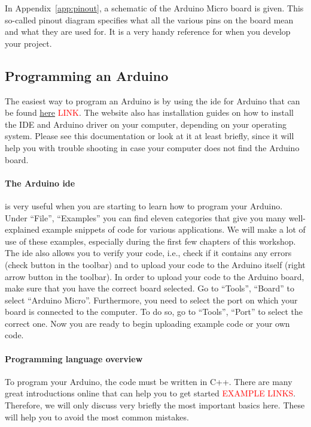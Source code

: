 In Appendix~\ref{app:pinout}, a schematic of the Arduino Micro board is given. This so-called pinout diagram specifies what all the various pins on the board mean and what they are used for. It is a very handy reference for when you develop your project.

\subsection{Programming an Arduino}

The easiest way to program an Arduino is by using the \ac{ide} for Arduino that can be found \href{LINKLINKLINK}{here} \textcolor{red}{LINK}. The website also has installation guides on how to install the IDE and Arduino driver on your computer, depending on your operating system. Please see this documentation or look at it at least briefly, since it will help you with trouble shooting in case your computer does not find the Arduino board.

\paragraph{The Arduino \ac{ide}} is very useful when you are starting to learn how to program your Arduino. Under ``File'', ``Examples'' you can find eleven categories that give you many well-explained example snippets of code for various applications. We will make a lot of use of these examples, especially during the first few chapters of this workshop. The \ac{ide} also allows you to verify your code, i.e., check if it contains any errors (check button in the toolbar) and to upload your code to the Arduino itself (right arrow button in the toolbar). In order to upload your code to the Arduino board, make sure that you have the correct board selected. Go to ``Tools'', ``Board'' to select ``Arduino Micro''. Furthermore, you need to select the port on which your board is connected to the computer. To do so, go to ``Tools'', ``Port'' to select the correct one. Now you are ready to begin uploading example code or your own code.

\paragraph{Programming language overview} To program your Arduino, the code must be written in C++. There are many great introductions online that can help you to get started \textcolor{red}{EXAMPLE LINKS}. Therefore, we will only discuss very briefly the most important basics here. These will help you to avoid the most common mistakes.

